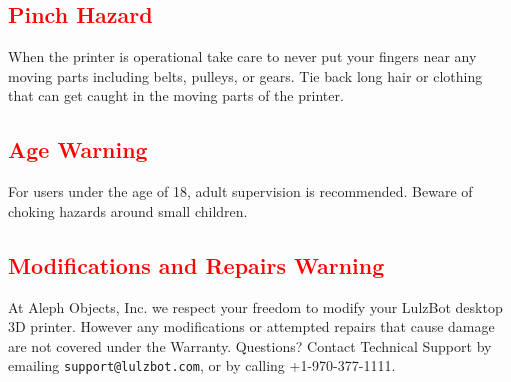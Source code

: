 \subsection{\textcolor{red}{Pinch Hazard}}

When the printer is operational take care to never put your fingers near any moving parts including belts, pulleys, or gears. Tie back long hair or clothing that can get caught in the moving parts of the printer.

\subsection{\textcolor{red}{Age Warning}}

For users under the age of 18, adult supervision is recommended. Beware of choking hazards around small children.




\subsection{\textcolor{red}{Modifications and Repairs Warning}}

At Aleph Objects, Inc.\textsuperscript{\miniscule{\textregistered}} we respect your freedom to modify your LulzBot desktop 3D printer. However any modifications or attempted repairs that cause damage are not covered under the Warranty. Questions? Contact Technical Support by emailing \texttt{support@lulzbot.com}, or by calling +1-970-377-1111.

